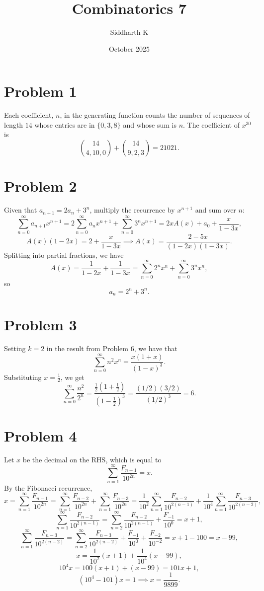 \documentclass{article}
\title{Combinatorics 7}
\author{Siddharth K}
\date{October 2025}
\begin{document}
\maketitle

\section*{Problem 1}
Each coefficient, $n$, in the generating function counts the number of sequences of length $14$ whose entries are in $\{0, 3, 8\}$ and whose sum is $n$. The coefficient of $x^{30}$ is
$$\binom{14}{4, 10, 0} + \binom{14}{9, 2, 3} = 21021.$$

\section*{Problem 2}
Given that $a_{n + 1} = 2a_n + 3^n$, multiply the recurrence by $x^{n + 1}$ and sum over $n$:
$$\sum_{n = 0}^\infty a_{n + 1}x^{n + 1} = 2\sum_{n = 0}^\infty a_nx^{n + 1} + \sum_{n = 0}^\infty 3^nx^{n + 1} = 2xA(x) + a_0 + \frac{x}{1 - 3x},$$
$$A(x)(1 - 2x) = 2 + \frac{x}{1 - 3x} \implies A(x) = \frac{2 - 5x}{(1 - 2x)(1 - 3x)}.$$
Splitting into partial fractions, we have
$$A(x) = \frac{1}{1 - 2x} + \frac{1}{1 - 3x} = \sum_{n = 0}^\infty 2^nx^n + \sum_{n = 0}^\infty 3^nx^n,$$
so
$$a_n = 2^n + 3^n.$$

\section*{Problem 3}
Setting $k = 2$ in the result from Problem 6, we have that
$$\sum_{n = 0}^\infty n^2x^n = \frac{x(1 + x)}{(1 - x)^3}.$$
Substituting $x = \frac{1}{2}$, we get
$$\sum_{n = 0}^\infty \frac{n^2}{2^n} = \frac{\frac{1}{2}(1 + \frac{1}{2})}{(1 - \frac{1}{2})^3} = \frac{(1/2)(3/2)}{(1/2)^3} = 6.$$

\section*{Problem 4}
Let $x$ be the decimal on the RHS, which is equal to
$$\sum_{n = 1}^\infty \frac{F_{n - 1}}{10^{2n}} = x.$$
By the Fibonacci recurrence,
$$x = \sum_{n = 1}^\infty \frac{F_{n - 1}}{10^{2n}} = \sum_{n = 1}^\infty \frac{F_{n - 2}}{10^{2n}} + \sum_{n = 1}^\infty \frac{F_{n - 3}}{10^{2n}} = \frac{1}{10^2}\sum_{n = 1}^\infty \frac{F_{n - 2}}{10^{2(n-1)}} + \frac{1}{10^4}\sum_{n = 1}^\infty \frac{F_{n - 3}}{10^{2(n-2)}},$$
$$\sum_{n = 1}^\infty \frac{F_{n - 2}}{10^{2(n-1)}} = \sum_{n = 2}^\infty \frac{F_{n - 2}}{10^{2(n-1)}} + \frac{F_{-1}}{10^0} = x + 1,$$
$$\sum_{n = 1}^\infty \frac{F_{n - 3}}{10^{2(n-2)}} = \sum_{n = 2}^\infty \frac{F_{n - 3}}{10^{2(n-2)}} + \frac{F_{-1}}{10^0} + \frac{F_{-2}}{10^{-2}} = x + 1 - 100 = x - 99,$$
$$x = \frac{1}{10^2}(x + 1) + \frac{1}{10^4}(x - 99),$$
$$10^4x = 100(x + 1) + (x - 99) = 101x + 1,$$
$$(10^4 - 101)x = 1 \implies x = \frac{1}{9899}.$$
\end{document}
